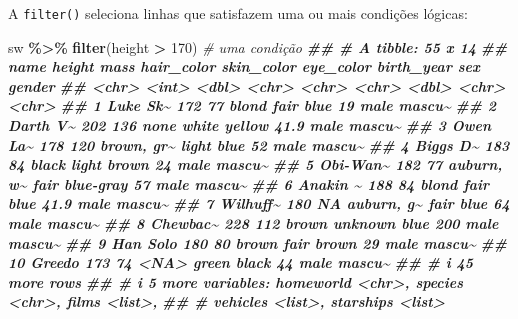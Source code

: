 \documentclass[
  portuguese,
  11pt,
  openany]{book}
\newenvironment{Shaded}{\begin{snugshade}}{\end{snugshade}}
\newcommand{\CommentTok}[1]{\textcolor[rgb]{0.56,0.35,0.01}{\textit{#1}}}
\newcommand{\DecValTok}[1]{\textcolor[rgb]{0.00,0.00,0.81}{#1}}
\newcommand{\DocumentationTok}[1]{\textcolor[rgb]{0.56,0.35,0.01}{\textbf{\textit{#1}}}}
\newcommand{\FunctionTok}[1]{\textcolor[rgb]{0.13,0.29,0.53}{\textbf{#1}}}
\newcommand{\NormalTok}[1]{#1}
\newcommand{\SpecialCharTok}[1]{\textcolor[rgb]{0.81,0.36,0.00}{\textbf{#1}}}
\newcounter{none} %
\begin{document}
A \texttt{filter()} seleciona linhas que satisfazem uma ou mais condições lógicas:

\begin{Shaded}
\begin{Highlighting}[]
\NormalTok{sw }\SpecialCharTok{\%\textgreater{}\%} \FunctionTok{filter}\NormalTok{(height }\SpecialCharTok{\textgreater{}} \DecValTok{170}\NormalTok{)                       }\CommentTok{\# uma condição}
\DocumentationTok{\#\# \# A tibble: 55 x 14}
\DocumentationTok{\#\#    name     height  mass hair\_color skin\_color eye\_color birth\_year sex   gender}
\DocumentationTok{\#\#    \textless{}chr\textgreater{}     \textless{}int\textgreater{} \textless{}dbl\textgreater{} \textless{}chr\textgreater{}      \textless{}chr\textgreater{}      \textless{}chr\textgreater{}          \textless{}dbl\textgreater{} \textless{}chr\textgreater{} \textless{}chr\textgreater{} }
\DocumentationTok{\#\#  1 Luke Sk\textasciitilde{}    172    77 blond      fair       blue            19   male  mascu\textasciitilde{}}
\DocumentationTok{\#\#  2 Darth V\textasciitilde{}    202   136 none       white      yellow          41.9 male  mascu\textasciitilde{}}
\DocumentationTok{\#\#  3 Owen La\textasciitilde{}    178   120 brown, gr\textasciitilde{} light      blue            52   male  mascu\textasciitilde{}}
\DocumentationTok{\#\#  4 Biggs D\textasciitilde{}    183    84 black      light      brown           24   male  mascu\textasciitilde{}}
\DocumentationTok{\#\#  5 Obi{-}Wan\textasciitilde{}    182    77 auburn, w\textasciitilde{} fair       blue{-}gray       57   male  mascu\textasciitilde{}}
\DocumentationTok{\#\#  6 Anakin \textasciitilde{}    188    84 blond      fair       blue            41.9 male  mascu\textasciitilde{}}
\DocumentationTok{\#\#  7 Wilhuff\textasciitilde{}    180    NA auburn, g\textasciitilde{} fair       blue            64   male  mascu\textasciitilde{}}
\DocumentationTok{\#\#  8 Chewbac\textasciitilde{}    228   112 brown      unknown    blue           200   male  mascu\textasciitilde{}}
\DocumentationTok{\#\#  9 Han Solo    180    80 brown      fair       brown           29   male  mascu\textasciitilde{}}
\DocumentationTok{\#\# 10 Greedo      173    74 \textless{}NA\textgreater{}       green      black           44   male  mascu\textasciitilde{}}
\DocumentationTok{\#\# \# i 45 more rows}
\DocumentationTok{\#\# \# i 5 more variables: homeworld \textless{}chr\textgreater{}, species \textless{}chr\textgreater{}, films \textless{}list\textgreater{},}
\DocumentationTok{\#\# \#   vehicles \textless{}list\textgreater{}, starships \textless{}list\textgreater{}}

\end{Highlighting}
\end{Shaded}
\end{document}
